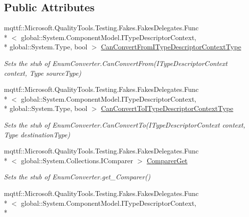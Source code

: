 \subsection*{Public Attributes}
\begin{DoxyCompactItemize}
\item 
mqttf\-::\-Microsoft.\-Quality\-Tools.\-Testing.\-Fakes.\-Fakes\-Delegates.\-Func\\*
$<$ global\-::\-System.\-Component\-Model.\-I\-Type\-Descriptor\-Context, \\*
global\-::\-System.\-Type, bool $>$ \hyperlink{class_system_1_1_component_model_1_1_fakes_1_1_stub_enum_converter_a7fbfc011666e3029df3be045c9e131f2}{Can\-Convert\-From\-I\-Type\-Descriptor\-Context\-Type}
\begin{DoxyCompactList}\small\item\em Sets the stub of Enum\-Converter.\-Can\-Convert\-From(\-I\-Type\-Descriptor\-Context context, Type source\-Type)\end{DoxyCompactList}\item 
mqttf\-::\-Microsoft.\-Quality\-Tools.\-Testing.\-Fakes.\-Fakes\-Delegates.\-Func\\*
$<$ global\-::\-System.\-Component\-Model.\-I\-Type\-Descriptor\-Context, \\*
global\-::\-System.\-Type, bool $>$ \hyperlink{class_system_1_1_component_model_1_1_fakes_1_1_stub_enum_converter_a64fb4f816848042fcd8abc2008a95a06}{Can\-Convert\-To\-I\-Type\-Descriptor\-Context\-Type}
\begin{DoxyCompactList}\small\item\em Sets the stub of Enum\-Converter.\-Can\-Convert\-To(\-I\-Type\-Descriptor\-Context context, Type destination\-Type)\end{DoxyCompactList}\item 
mqttf\-::\-Microsoft.\-Quality\-Tools.\-Testing.\-Fakes.\-Fakes\-Delegates.\-Func\\*
$<$ global\-::\-System.\-Collections.\-I\-Comparer $>$ \hyperlink{class_system_1_1_component_model_1_1_fakes_1_1_stub_enum_converter_a08af69d9d097edbd7187c60e8e35e032}{Comparer\-Get}
\begin{DoxyCompactList}\small\item\em Sets the stub of Enum\-Converter.\-get\-\_\-\-Comparer()\end{DoxyCompactList}\item 
mqttf\-::\-Microsoft.\-Quality\-Tools.\-Testing.\-Fakes.\-Fakes\-Delegates.\-Func\\*
$<$ global\-::\-System.\-Component\-Model.\-I\-Type\-Descriptor\-Context, \\*

\end{DoxyCompactItemize}
